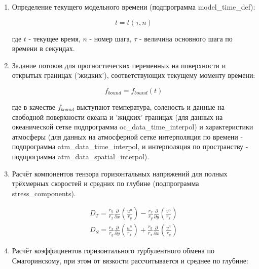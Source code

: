 \begin{enumerate}
\item  Определение текущего модельного времени (подпрограмма model\_time\_def):

\begin{equation} \label{eq:inmsom/10} 
  \displaystyle{ t = t(\tau ,n)   }
\end{equation} 

где $t$ - текущее время, $n$ - номер шага, $\tau $ - величина основного шага по времени в секундах. 

\item  Задание потоков для прогностических переменных на поверхности и открытых границах ('жидких'), соответствующих текущему моменту времени:

\begin{equation} \label{eq:inmsom/11} 
   \displaystyle{ f_{bound} =f_{bound} (t) }
\end{equation} 

где в качестве $f_{bound} $ выступают температура, соленость и данные на свободной поверхности океана и 'жидких' границах 
(для данных на океанической сетке подпрограмма oc\_data\_time\_interpol) и 
характеристики атмосферы (для данных на атмосферной сетке интерполяция по времени - подпрограмма atm\_data\_time\_interpol, 
и интерполяция по пространству - подпрограмма atm\_data\_spatial\_interpol).

\item Расчёт компонентов тензора горизонтальных напряжений для полных трёхмерных скоростей и средних по глубине (подпрограмма stress\_components).

\begin{equation} \label{eq:inmsom/12} 
\begin{array}{l} 
\displaystyle{ D_{T} =\frac{r_{y} }{r_{x} } \frac{\partial }{\partial x} \left(\frac{u^{n} }{r_{y} } \right)-\frac{r_{x} }{r_{y} } \frac{\partial }{\partial y} \left(\frac{v^{n} }{r_{x} } \right) } \\ 

\displaystyle{ D_{S} =\frac{r_{x} }{r_{y} } \frac{\partial }{\partial y} \left(\frac{u^{n} }{r_{x} } \right)+\frac{r_{y} }{r_{x} } \frac{\partial }{\partial x} \left(\frac{v^{n} }{r_{y} } \right) }
\end{array} 
\end{equation} 

\item Расчёт коэффициентов горизонтального турбулентного обмена по Смагоринскому, при этом от вязкости рассчитывается и среднее по глубине:


\end{enumerate}
